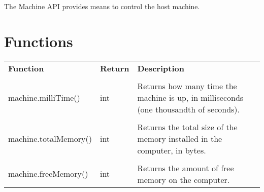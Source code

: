 The Machine API provides means to control the host machine.

\section{Functions}

\begin{tabularx}{\textwidth}{l l X}
	\textbf{\large Function} & \textbf{\large Return} & \textbf{\large Description}
	\\ \\
	\endhead
	machine.milliTime() & int & Returns how many time the machine is up, in milliseconds (one thousandth of seconds).
	\\ \\
	machine.totalMemory() & int & Returns the total size of the memory installed in the computer, in bytes.
	\\ \\
	machine.freeMemory() & int & Returns the amount of free memory on the computer.
\end{tabularx}
